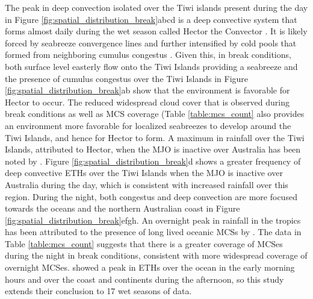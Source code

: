 \documentclass[journal abbreviation, manuscript]{copernicus}
\begin{document}
    The peak in deep convection isolated over the Tiwi islands present during the day in Figure \ref{fig:spatial_distribution_break}abcd is a deep convective system that forms almost daily during the wet season called Hector the Convector \citep{Keenanetal1989, Crook2001}. It is likely forced by seabreeze convergence lines and further intensified by cold pools that formed from neighboring cumulus congestus \citep{Dauhutetal2016}. Given this, in break conditions, both surface level easterly flow onto the Tiwi Islands providing a seabreeze and the presence of cumulus congestus over the Tiwi Islands in Figure \ref{fig:spatial_distribution_break}ab show that the environment is favorable for Hector to occur. The reduced widespread cloud cover that is observed during break conditions \citep{Mayetal2012} as well as MCS coverage (Table \ref{table:mcs_count} also provides an environment more favorable for localized seabreezes to develop around the Tiwi Islands, and hence for Hector to form. A maximum in rainfall over the Tiwi Islands, attributed to Hector, when the MJO is inactive over Australia has been noted by \cite{RauniyarandWalsh2016}. Figure \ref{fig:spatial_distribution_break}d shows a greater frequency of deep convective ETHs over the Tiwi Islands when the MJO is inactive over Australia during the day, which is consistent with increased rainfall over this region. During the night, both congestus and deep convection are more focused towards the oceans and the northern Australian coast in Figure \ref{fig:spatial_distribution_break}efgh. An overnight peak in rainfall in the tropics has been attributed to the presence of long lived oceanic MCSs by \cite{NesbittandZipser2003}. The data in Table \ref{table:mcs_count} suggests that there is a greater coverage of MCSes during the night in break conditions, consistent with more widespread coverage of overnight MCSes. \cite{Kumaretal2013} showed a peak in ETHs over the ocean in the early morning hours and over the coast and continents during the afternoon, so this study extends their conclusion to 17 wet seasons of data.
\end{document}
